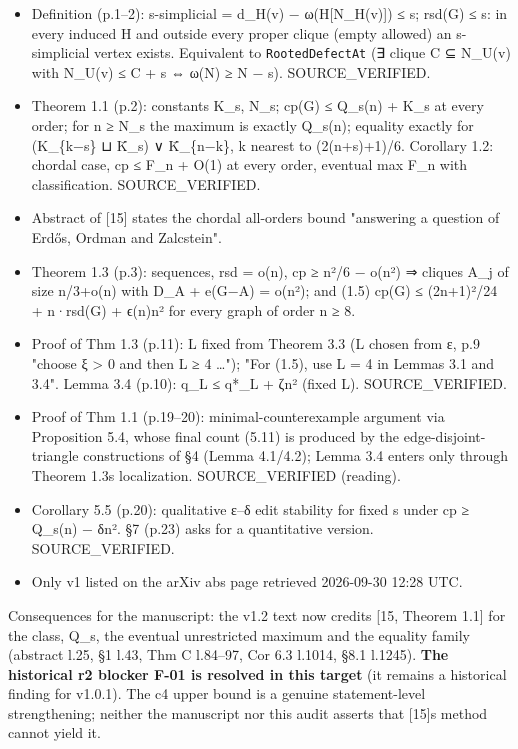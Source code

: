 \documentclass[
]{article}
\providecommand{\tightlist}{%
  \setlength{\itemsep}{0pt}\setlength{\parskip}{0pt}}
\begin{document}
\begin{itemize}
\tightlist
\item
  Definition (p.1--2): s-simplicial = d\_H(v) − ω(H{[}N\_H(v){]}) ≤ s;
  rsd(G) ≤ s: in every induced H and outside every proper clique (empty
  allowed) an s-simplicial vertex exists. Equivalent to
  \texttt{RootedDefectAt} (∃ clique C ⊆ N\_U(v) with
  \textbar N\_U(v)\textbar{} ≤ \textbar C\textbar{} + s ⇔ ω(N) ≥
  \textbar N\textbar{} − s). SOURCE\_VERIFIED.
\item
  Theorem 1.1 (p.2): constants K\_s, N\_s; cp(G) ≤ Q\_s(n) + K\_s at
  every order; for n ≥ N\_s the maximum is exactly Q\_s(n); equality
  exactly for (K\_\{k−s\} ⊔ K̄\_s) ∨ K̄\_\{n−k\}, k nearest to
  (2(n+s)+1)/6. Corollary 1.2: chordal case, cp ≤ F\_n + O(1) at every
  order, eventual max F\_n with classification. SOURCE\_VERIFIED.
\item
  Abstract of {[}15{]} states the chordal all-orders bound "answering a
  question of Erdős, Ordman and Zalcstein".
\item
  Theorem 1.3 (p.3): sequences, rsd = o(n), cp ≥ n²/6 − o(n²) ⇒ cliques
  A\_j of size n/3+o(n) with D\_A + e(G−A) = o(n²); and (1.5) cp(G) ≤
  (2n+1)²/24 + n·rsd(G) + ϵ(n)n² for every graph of order n ≥ 8.
\item
  Proof of Thm 1.3 (p.11): L fixed from Theorem 3.3 (L chosen from ε,
  p.9 "choose ξ \textgreater{} 0 and then L ≥ 4 \ldots"); "For (1.5),
  use L = 4 in Lemmas 3.1 and 3.4". Lemma 3.4 (p.10): q\_L ≤ q*\_L + ζn²
  (fixed L). SOURCE\_VERIFIED.
\item
  Proof of Thm 1.1 (p.19--20): minimal-counterexample argument via
  Proposition 5.4, whose final count (5.11) is produced by the
  edge-disjoint-triangle constructions of §4 (Lemma 4.1/4.2); Lemma 3.4
  enters only through Theorem 1.3\textquotesingle s localization.
  SOURCE\_VERIFIED (reading).
\item
  Corollary 5.5 (p.20): qualitative ε--δ edit stability for fixed s
  under cp ≥ Q\_s(n) − δn². §7 (p.23) asks for a quantitative version.
  SOURCE\_VERIFIED.
\item
  Only v1 listed on the arXiv abs page retrieved 2026-09-30 12:28 UTC.
\end{itemize}

Consequences for the manuscript: the v1.2 text now credits {[}15,
Theorem 1.1{]} for the class, Q\_s, the eventual unrestricted maximum
and the equality family (abstract l.25, §1 l.43, Thm C l.84--97, Cor 6.3
l.1014, §8.1 l.1245). \textbf{The historical r2 blocker F-01 is resolved
in this target} (it remains a historical finding for v1.0.1). The c4
upper bound is a genuine statement-level strengthening; neither the
manuscript nor this audit asserts that {[}15{]}\textquotesingle s method
cannot yield it.
\end{document}
